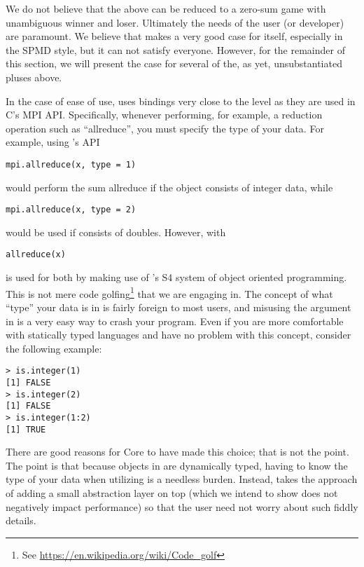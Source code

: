 We do not believe that the above can be reduced to a zero-sum game with
unambiguous winner and loser. Ultimately the needs of the user (or
developer) are paramount. We believe that 
makes a very good case for itself, especially in the SPMD style,
but it can not satisfy everyone. However, for the remainder of this
section, we will present the case for several of the, as yet,
unsubstantiated pluses above.

In the case of ease of use,  uses bindings very close to the
level as they are used in C's MPI API. Specifically, whenever performing,
for example, a reduction operation such as ``allreduce'', you must specify the
type of your data. For example, using 's API
\begin{lstlisting}[language=rr]
mpi.allreduce(x, type = 1)
\end{lstlisting}
would perform the sum allreduce if the object  consists of integer
data, while
\begin{lstlisting}[language=rr]
mpi.allreduce(x, type = 2)
\end{lstlisting}
would be used if  consists of doubles. However, with 
\begin{lstlisting}[language=rr]
allreduce(x)
\end{lstlisting}
is used for both by making use of 's S4 system of object
oriented programming. This is not mere code
golfing\footnote{See \url{https://en.wikipedia.org/wiki/Code_golf}}
that we are engaging in. The concept of what ``type'' your data is
in  is fairly foreign to most  users, and
misusing the  argument in  is a very easy way
to crash your program. Even if you are more comfortable with statically
typed languages and have no problem with this concept, consider the
following example:

\begin{lstlisting}[language=rr,title=Types in R]
> is.integer(1)
[1] FALSE
> is.integer(2)
[1] FALSE
> is.integer(1:2)
[1] TRUE
\end{lstlisting}

There are good reasons for  Core to have made this choice;
that is not the point. The point is that because objects in
 are dynamically typed, having to know the type of your
data when utilizing  is a needless burden. Instead,
 takes the approach of adding a small abstraction
layer on top (which we intend to show does not negatively impact
performance) so that the user need not worry about such fiddly details.

